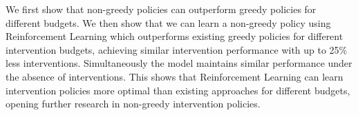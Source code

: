 \documentclass[../main.tex]{subfiles}
\begin{document}
We first show that non-greedy policies can outperform 
greedy policies for different budgets.
We then show that we can learn a non-greedy policy using Reinforcement Learning which outperforms
existing greedy policies for different intervention budgets, achieving 
similar intervention performance with up to 25\% less interventions.
Simultaneously the model maintains similar 
performance under the absence of interventions.
This shows that Reinforcement Learning can
 learn intervention policies more optimal than
existing approaches for different budgets, 
opening further research in non-greedy intervention policies.


\end{document}
